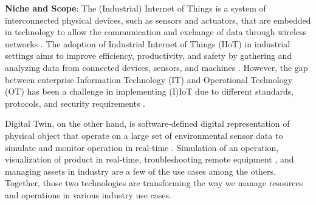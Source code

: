 

\textbf{Niche and Scope}:
% 
The (Industrial) Internet of Things is a system of interconnected physical devices, such as sensors and actuators, that are embedded in technology to allow the communication and exchange of data through wireless networks \cite{maillet-contozEndtoendSecurityValidation2020}. The adoption of Industrial Internet of Things (IIoT) in industrial settings aims to improve efficiency, productivity, and safety by gathering and analyzing data from connected devices, sensors, and machines \cite{kumarBlockchainDeepLearning2022}. However, the gap between enterprise Information Technology (IT) and Operational Technology (OT) has been a challenge in implementing (I)IoT due to different standards, protocols, and security requirements \cite{adrienbacueDigitalTwinsEnhanced2022}.

Digital Twin, on the other hand, is software-defined digital representation of physical object that operate on a large set of environmental sensor data to simulate and monitor operation in real-time \cite{williamdanilczykANGELIntelligentDigital2019, danilczykSmartGridAnomaly2021}. Simulation of an operation, visualization of product in real-time, troubleshooting remote equipment \cite{alcarazDigitalTwinComprehensive2022, veledarDigitalTwinsDependability2019, vargheseDigitalTwinbasedIntrusion2022}, and managing assets in industry are a few of the use cases among the others. Together, those two technologies are transforming the way we manage resources and operations in various industry use cases.


